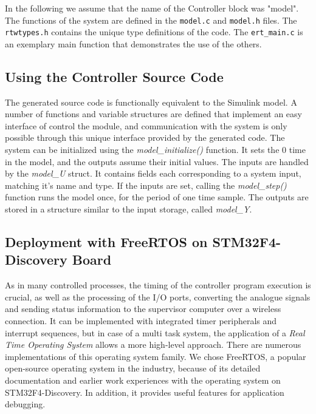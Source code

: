 In the following we assume that the name of the Controller block was "model". The functions of the system are defined in the \texttt{model.c} and \texttt{model.h} files. The \texttt{rtwtypes.h} contains the unique type definitions of the code. The \texttt{ert\_main.c} is an exemplary main function that demonstrates the use of the others.

\subsection{Using the Controller Source Code}

The generated source code is functionally equivalent to the \textsf{Simulink} model. A number of functions and variable structures are defined that implement an easy interface of control the module, and communication with the system is only possible through this unique interface provided by the generated code. The system can be initialized using the \emph{model\_initialize()} function. It sets the 0 time in the model, and the outputs assume their initial values. The inputs are handled by the \emph{model\_U} struct. It contains fields each corresponding to a system input, matching it's name and type. If the inputs are set, calling the \emph{model\_step()} function runs the model once, for the period of one time sample. The outputs are stored in a structure similar to the input storage, called \emph{model\_Y}.

\subsection{Deployment with FreeRTOS on STM32F4-Discovery Board}

As in many controlled processes, the timing of the controller program execution is crucial, as well as the processing of the \textsf{I/O} ports, converting the analogue signals and sending status information to the supervisor computer over a wireless connection. It can be implemented with integrated timer peripherals and interrupt sequences, but in case of a multi task system, the application of a \emph{Real Time Operating System} allows a more high-level approach. There are numerous implementations of this operating system family. We chose \textsf{FreeRTOS}, a popular open-source operating system in the industry, because of its detailed documentation and earlier work experiences with the operating system on \textsf{STM32F4-Discovery}. In addition, it provides useful features for application debugging.

